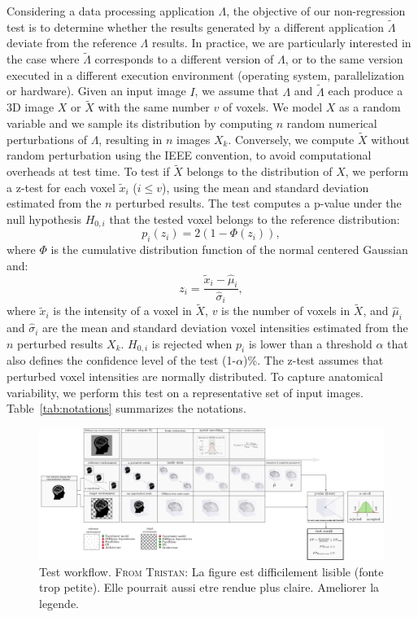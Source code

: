 \documentclass{article}
\newcommand{\TG}[1]{\color{blue}\textsc{From Tristan:} #1\color{black}\xspace}
\begin{document}
Considering a data processing application $\Lambda$, the objective of our non-regression test is to determine whether the results generated by a different application $\tilde \Lambda$ deviate from the reference $\Lambda$ results. In practice, we are particularly interested in the case where $\tilde \Lambda$ corresponds to a different version of $\Lambda$, or to the same version executed in a different execution environment (operating system, parallelization or hardware). Given an input image $I$, we assume that $\Lambda$ and $\tilde \Lambda$ each produce a 3D image $X$ or $\tilde X$ with the same number $v$ of voxels. We model $X$ as a random variable and we sample its distribution by computing $n$ random numerical perturbations of $\Lambda$, resulting in $n$ images $X_k$. Conversely, we compute $\tilde X$ without random perturbation using the IEEE convention, to avoid computational overheads at test time. To test if $\tilde X$ belongs to the distribution of $X$, we perform a z-test for each voxel $\tilde x_i$ ($i\leq v$), using the mean and standard deviation estimated from the $n$ perturbed results. The test computes a p-value under the null hypothesis $H_{0,i}$ that the tested voxel belongs to the reference distribution:
\begin{equation} \label{eq:pval}
    p_i(z_i) = 2 \left(1-\Phi(z_i)\right),
\end{equation}
where $\Phi$ is the cumulative distribution function of the normal centered
Gaussian and:
\begin{equation*}
    z_i = \frac{\tilde x_i-\hat \mu_i}{\hat \sigma_i},
\end{equation*}
where $\tilde x_i$ is the intensity of a voxel in $\tilde X$, $v$ is the number of voxels in $\tilde X$, and $\hat \mu_i$ and $\hat \sigma_i$ are the mean and standard deviation voxel intensities estimated from the $n$ perturbed results $X_k$. $H_{0,i}$ is rejected when $p_i$ is lower than a threshold $\alpha$ that also defines the confidence level of the test (1-$\alpha$)\%. The z-test assumes that perturbed voxel intensities are normally distributed. To capture anatomical variability, we perform this test on a representative set of input images. Table~\ref{tab:notations} summarizes the notations.

\begin{figure}
    \centering
    \includegraphics[width=\linewidth]{figures/stat_test_procedure.pdf}
    \caption{Test workflow. \TG{La figure est difficilement lisible (fonte trop petite). Elle pourrait aussi etre rendue plus claire. Ameliorer la legende.}}
    \label{fig:test_workflow}
\end{figure}
\end{document}
